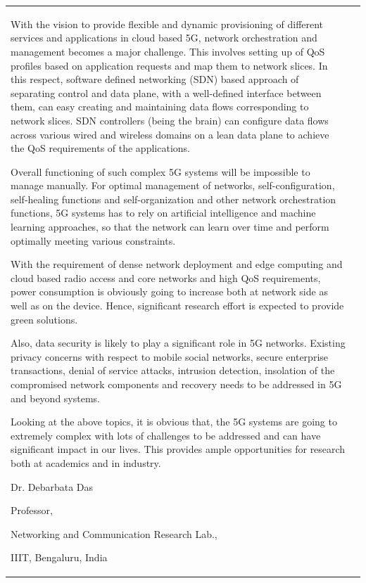 {\begin{tabular}{p{.2\paperwidth}@{}!{\color{goldan-yellow}\vline width .9pt}p{.64\paperwidth}}
\bigskip

With the vision to provide flexible and dynamic provisioning of different services and applications in cloud based 5G, network orchestration and management becomes a major challenge. This involves setting up of QoS profiles based on application requests and map them to network slices. In this respect, software defined networking (SDN) based approach of separating control and data plane, with a well-defined interface between them, can easy creating and maintaining data flows corresponding to network slices. SDN controllers (being the brain) can configure data flows across various wired and wireless domains on a lean data plane to achieve the QoS requirements of the applications. 

\bigskip

Overall functioning of such complex 5G systems will be impossible to manage manually. For optimal management of networks, self-configuration, self-healing functions and self-organization and other network orchestration functions, 5G systems has to rely on artificial intelligence and machine learning approaches, so that the network can learn over time and perform optimally meeting various constraints.

\bigskip

With the requirement of dense network deployment and edge computing and cloud based radio access and core networks and high QoS requirements, power consumption is obviously going to increase both at network side as well as on the device. Hence, significant research effort is expected to provide green solutions.


\bigskip

Also, data security is likely to play a significant role in 5G networks. Existing privacy concerns with respect to mobile social networks, secure enterprise transactions, denial of service attacks, intrusion detection, insolation of the compromised network components and recovery needs to be addressed in 5G and beyond systems.

\bigskip

Looking at the above topics, it is obvious that, the 5G systems are going to extremely complex with lots of challenges to be addressed and can have significant impact in our lives. This provides ample opportunities for research both at academics and in industry.

\bigskip

\hfill  Dr. Debarbata Das\hspace{1cm}\,

\vskip 2pt

\hfill Professor,\hspace{.9cm}\,

\vskip 2pt

\hfill Networking and Communication Research Lab.,\hspace{.9cm}\,

\vskip 2pt

\hfill IIIT, Bengaluru, India\hspace{.9cm}\,

\end{tabular}
}





